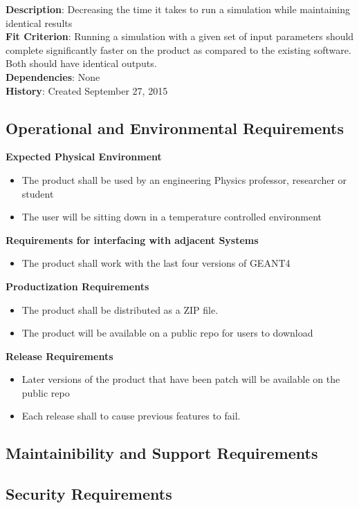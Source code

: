 \documentclass[12pt]{article}
\begin{document}
\textbf{Description}: Decreasing the time it takes to run a simulation while maintaining identical results\\

\textbf{Fit Criterion}: Running a simulation with a given set of input parameters should complete significantly faster on the product as compared to the existing software. Both should have identical outputs.\\

\textbf{Dependencies}: None\\

\textbf{History}: Created September 27, 2015

\subsection{Operational and Environmental Requirements} %
\textbf{Expected Physical Environment}
\begin{itemize}
	\item The product shall be used by an engineering Physics professor, researcher or student
	\item The user will be sitting down in a temperature controlled environment
\end{itemize}
\textbf{Requirements for interfacing with adjacent Systems}
\begin{itemize}
	\item The product shall work with the last four versions of GEANT4
\end{itemize}
\textbf{Productization Requirements}
\begin{itemize}
	\item The product shall be distributed as a ZIP file.
	\item The product will be available on a public repo for users to download
\end{itemize}
\textbf{Release Requirements}
\begin{itemize}
	\item Later versions of the product that have been patch will be available on the public repo
	\item Each release shall to cause previous features to fail.
\end{itemize}

\subsection{Maintainibility and Support Requirements} %
\subsection{Security Requirements} %
\end{document}
